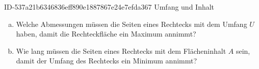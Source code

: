 \begin{exercise}
      {ID-537a21b6346836eff890e1887867e24e7efda367}
      {Umfang und Inhalt}
  \ifproblem\problem\par
    \begin{enumerate}[a)]
      \item Welche Abmessungen müssen die Seiten eines Rechtecks mit dem
            Umfang $U$ haben, damit die Rechteckfläche ein Maximum annimmt?
      \item Wie lang müssen die Seiten eines Rechtecks mit dem Flächeninhalt
            $A$ sein, damit der Umfang des Rechtecks ein Minimum annimmt?
    \end{enumerate}
  \fi
\end{exercise}
